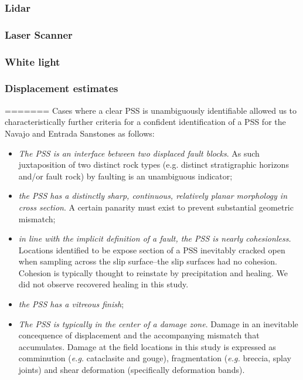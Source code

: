 \documentclass[12pt,a4paper]{article}
\begin{document}
		\subsubsection{Lidar}
		\subsubsection{Laser Scanner}
		\subsubsection{White light}
		\subsubsection{Displacement estimates}
=======
Cases where a clear PSS is unambiguously identifiable allowed us to characteristically further criteria for a confident identification of a PSS for the Navajo and Entrada Sanstones as follows:

\begin{itemize}

	\item \textit{The PSS is an interface between two displaced fault blocks}. As such juxtaposition of two distinct rock types (e.g. distinct stratigraphic horizons and/or fault rock) by faulting is an unambiguous indicator;
	
	\item \textit{the PSS has a distinctly sharp, continuous, relatively planar morphology in cross section}. A certain panarity must exist to prevent substantial geometric mismatch;
	
	\item \textit{in line with the implicit definition of a fault, the PSS is nearly cohesionless.} Locations identified to be expose section of a PSS inevitably cracked open when sampling across the slip surface--the slip surfaces had no cohesion. Cohesion is typically thought to reinstate by precipitation and healing. We did not observe recovered healing in this study.
	
	\item \textit{the PSS has a vitreous finish};
	
	\item \textit{The PSS is typically in the center of a damage zone}. Damage in an inevitable concequence of displacement and the accompanying mismatch that accumulates. Damage at the field locations in this study is expressed as comminution (\textit{e.g.} cataclasite and gouge), fragmentation (\textit{e.g.} breccia, splay joints) and shear deformation (specifically deformation bands).
	
\end{itemize}
\end{document}
